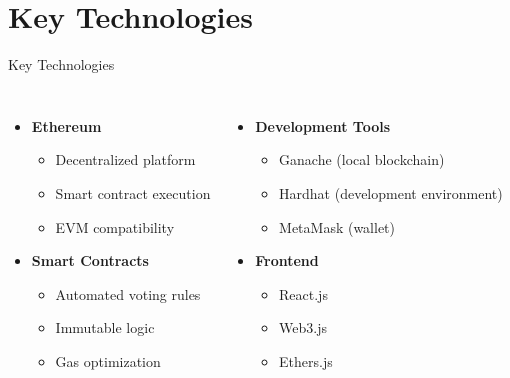 \documentclass{beamer}
\begin{document}
\section{Key Technologies}
\begin{frame}{Key Technologies}
  \begin{columns}
    \begin{itemize}
      \item \textbf{Ethereum}
        \begin{itemize}
          \item Decentralized platform
          \item Smart contract execution
          \item EVM compatibility
        \end{itemize}
      \item \textbf{Smart Contracts}
        \begin{itemize}
          \item Automated voting rules
          \item Immutable logic
          \item Gas optimization
        \end{itemize}
    \end{itemize}
    \begin{itemize}
      \item \textbf{Development Tools}
        \begin{itemize}
          \item Ganache (local blockchain)
          \item Hardhat (development environment)
          \item MetaMask (wallet)
        \end{itemize}
      \item \textbf{Frontend}
        \begin{itemize}
          \item React.js
          \item Web3.js
          \item Ethers.js
        \end{itemize}
    \end{itemize}
  \end{columns}
\end{frame}
\end{document}
